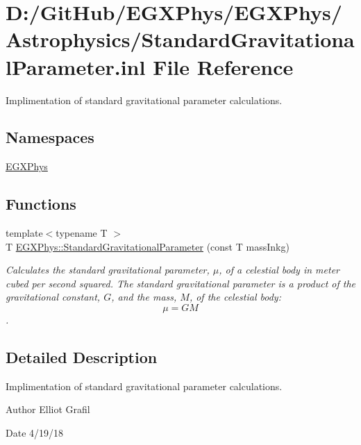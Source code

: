 \hypertarget{_standard_gravitational_parameter_8inl}{}\section{D\+:/\+Git\+Hub/\+E\+G\+X\+Phys/\+E\+G\+X\+Phys/\+Astrophysics/\+Standard\+Gravitational\+Parameter.inl File Reference}
\label{_standard_gravitational_parameter_8inl}


Implimentation of standard gravitational parameter calculations.  


\subsection*{Namespaces}
\begin{DoxyCompactItemize}
\item 
 \mbox{\hyperlink{namespace_e_g_x_phys}{E\+G\+X\+Phys}}
\end{DoxyCompactItemize}
\subsection*{Functions}
\begin{DoxyCompactItemize}
\item 
{\footnotesize template$<$typename T $>$ }\\T \mbox{\hyperlink{group___e_g_x_phys-_astrophysics-_standard_gravitational_parameter_ga37f4ed78b0fc23603b49ade3e435ea20}{E\+G\+X\+Phys\+::\+Standard\+Gravitational\+Parameter}} (const T mass\+Inkg)
\begin{DoxyCompactList}\small\item\em Calculates the standard gravitational parameter, $\mu$, of a celestial body in meter cubed per second squared. The standard gravitational parameter is a product of the gravitational constant, $G$, and the mass, $M$, of the celestial body\+: \[\mu = GM\]. \end{DoxyCompactList}\end{DoxyCompactItemize}


\subsection{Detailed Description}
Implimentation of standard gravitational parameter calculations. 

\begin{DoxyAuthor}{Author}
Elliot Grafil 
\end{DoxyAuthor}
\begin{DoxyDate}{Date}
4/19/18 
\end{DoxyDate}
